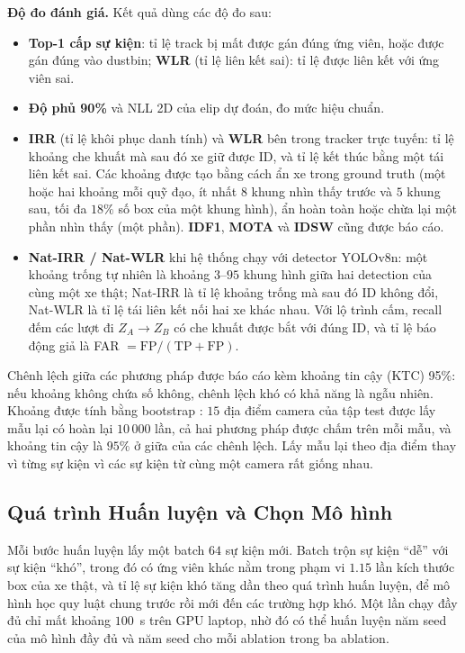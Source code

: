 \textbf{Độ đo đánh giá.} Kết quả dùng các độ đo sau:
\begin{itemize}
    \item \textbf{Top-1 cấp sự kiện}: tỉ lệ track bị mất được gán đúng ứng viên, hoặc được gán đúng vào dustbin; \textbf{WLR} (tỉ lệ liên kết sai): tỉ lệ được liên kết với ứng viên sai.
    \item \textbf{Độ phủ 90\%} và NLL 2D của elip dự đoán, đo mức hiệu chuẩn.
    \item \textbf{IRR} (tỉ lệ khôi phục danh tính) và \textbf{WLR} bên trong tracker trực tuyến: tỉ lệ khoảng che khuất mà sau đó xe giữ được ID, và tỉ lệ kết thúc bằng một tái liên kết sai. Các khoảng được tạo bằng cách ẩn xe trong ground truth (một hoặc hai khoảng mỗi quỹ đạo, ít nhất $8$ khung nhìn thấy trước và $5$ khung sau, tối đa $18\%$ số box của một khung hình), ẩn hoàn toàn hoặc chừa lại một phần nhìn thấy (một phần). \textbf{IDF1}, \textbf{MOTA} và \textbf{IDSW} cũng được báo cáo.
    \item \textbf{Nat-IRR / Nat-WLR} khi hệ thống chạy với detector YOLOv8n: một khoảng trống tự nhiên là khoảng $3$--$95$ khung hình giữa hai detection của cùng một xe thật; Nat-IRR là tỉ lệ khoảng trống mà sau đó ID không đổi, Nat-WLR là tỉ lệ tái liên kết nối hai xe khác nhau. Với lộ trình cấm, recall đếm các lượt đi $Z_A\!\to\!Z_B$ có che khuất được bắt với đúng ID, và tỉ lệ báo động giả là FAR $= \text{FP}/(\text{TP}+\text{FP})$.
\end{itemize}
Chênh lệch giữa các phương pháp được báo cáo kèm khoảng tin cậy (KTC) 95\%: nếu khoảng không chứa số không, chênh lệch khó có khả năng là ngẫu nhiên. Khoảng được tính bằng bootstrap \cite{efron1994bootstrap}: $15$ địa điểm camera của tập test được lấy mẫu lại có hoàn lại $10\,000$ lần, cả hai phương pháp được chấm trên mỗi mẫu, và khoảng tin cậy là $95\%$ ở giữa của các chênh lệch. Lấy mẫu lại theo địa điểm thay vì từng sự kiện vì các sự kiện từ cùng một camera rất giống nhau.

\subsection{Quá trình Huấn luyện và Chọn Mô hình}
\label{sec:training_process}

Mỗi bước huấn luyện lấy một batch $64$ sự kiện mới. Batch trộn sự kiện ``dễ'' với sự kiện ``khó'', trong đó có ứng viên khác nằm trong phạm vi $1.15$ lần kích thước box của xe thật, và tỉ lệ sự kiện khó tăng dần theo quá trình huấn luyện, để mô hình học quy luật chung trước rồi mới đến các trường hợp khó. Một lần chạy đầy đủ chỉ mất khoảng $100$~s trên GPU laptop, nhờ đó có thể huấn luyện năm seed của mô hình đầy đủ và năm seed cho mỗi ablation trong ba ablation.


